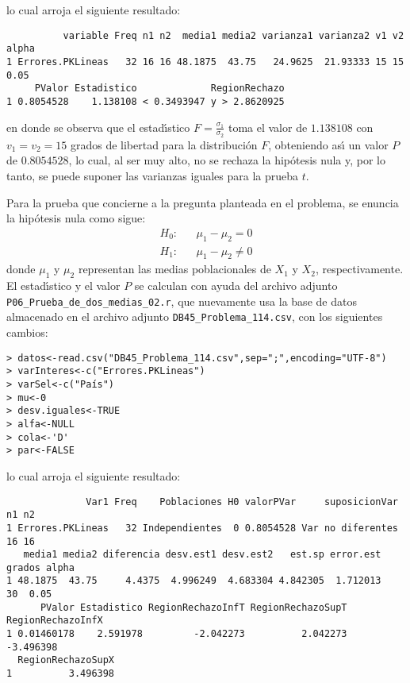 \begin{solucion}
 lo cual arroja el siguiente resultado:
 \begin{verbatim}
          variable Freq n1 n2  media1 media2 varianza1 varianza2 v1 v2 alpha
1 Errores.PKLineas   32 16 16 48.1875  43.75   24.9625  21.93333 15 15  0.05
     PValor Estadistico             RegionRechazo
1 0.8054528    1.138108 < 0.3493947 y > 2.8620925
 \end{verbatim}
 \vspace{-0.5cm}
 en donde se observa que el estad\'{\i}stico $F=\frac{\sigma_1}{\sigma_2}$
 toma el valor de $1.138108$ con $v_1 = v_2 = 15$ grados
 de libertad para la distribuci\'on $F$,
 obteniendo as\'{\i} un valor $P$ de $0.8054528$,
 lo cual, al ser muy alto, no se rechaza la hip\'otesis nula y,
 por lo tanto, se puede suponer las varianzas iguales para la prueba $t$.
 \par 
 Para la prueba que concierne a la pregunta planteada en el problema,
 se enuncia la hip\'otesis nula como sigue:
 \begin{eqnarray*}
  H_0: & & \mu_1 - \mu_2   =  0 \\
  H_1: & & \mu_1 - \mu_2 \neq 0
 \end{eqnarray*}
 donde $\mu_1$ y $\mu_2$ representan las medias poblacionales
 de $X_1$ y $X_2$, respectivamente.
 El estad\'{\i}stico y el valor $P$ se calculan con ayuda
 del archivo adjunto \texttt{P06\_Prueba\_de\_dos\_medias\_02.r},
 que nuevamente usa la base de datos almacenado en el archivo adjunto
 \texttt{DB45\_Problema\_114.csv}, con los siguientes cambios:
 \begin{verbatim}
> datos<-read.csv("DB45_Problema_114.csv",sep=";",encoding="UTF-8")
> varInteres<-c("Errores.PKLineas")
> varSel<-c("País")
> mu<-0
> desv.iguales<-TRUE
> alfa<-NULL
> cola<-'D'
> par<-FALSE
 \end{verbatim}
 \vspace{-0.5cm}
 lo cual arroja el siguiente resultado:
 \begin{verbatim}
              Var1 Freq    Poblaciones H0 valorPVar     suposicionVar n1 n2
1 Errores.PKLineas   32 Independientes  0 0.8054528 Var no diferentes 16 16
   media1 media2 diferencia desv.est1 desv.est2   est.sp error.est grados alpha
1 48.1875  43.75     4.4375  4.996249  4.683304 4.842305  1.712013     30  0.05
      PValor Estadistico RegionRechazoInfT RegionRechazoSupT RegionRechazoInfX
1 0.01460178    2.591978         -2.042273          2.042273         -3.496398
  RegionRechazoSupX
1          3.496398
 \end{verbatim}
 \vspace{-0.5cm}

\end{solucion}
